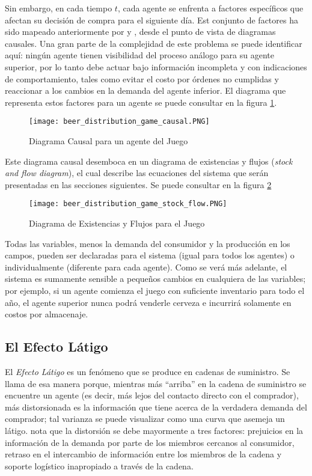 Sin embargo, en cada tiempo $t$, cada agente se enfrenta a factores espec\'ificos que afectan su decisi\'on de compra para el siguiente d\'ia. Est conjunto de factores ha sido mapeado anteriormente por \citet{Duggan} y \citet{Grasl}, desde el punto de vista de diagramas causales. Una gran parte de la complejidad de este problema se puede identificar aqu\'i: ning\'un agente tienen visibilidad del proceso an\'alogo para su agente superior, por lo tanto debe actuar bajo informaci\'on incompleta y con indicaciones de comportamiento, tales como evitar el costo por \'ordenes no cumplidas y reaccionar a los cambios en la demanda del agente inferior. El diagrama que representa estos factores para un agente se puede consultar en la figura \ref{causal}.

\begin{figure}[ht]
\caption{Diagrama Causal para un agente del Juego}
\label{causal}
\texttt{[image: beer\_distribution\_game\_causal.PNG]}
\centering
\end{figure}

Este diagrama causal desemboca en un diagrama de existencias y flujos (\textit{stock and flow diagram}), el cual describe las ecuaciones del sistema que ser\'an presentadas en las secciones siguientes. Se puede consultar en la figura \ref{stockflow}

\begin{figure}[ht]
\caption{Diagrama de Existencias y Flujos para el Juego}
\label{stockflow}
\texttt{[image: beer\_distribution\_game\_stock\_flow.PNG]}
\centering
\end{figure}

Todas las variables, menos la demanda del consumidor y la producci\'on en los campos, pueden ser declaradas para el sistema (igual para todos los agentes) o individualmente (diferente para cada agente). Como se ver\'a m\'as adelante, el sistema es sumamente sensible a peque\~nos cambios en cualquiera de las variables; por ejemplo, si un agente comienza el juego con suficiente inventario para todo el a\~no, el agente superior nunca podr\'a venderle cerveza e incurrir\'a solamente en costos por almacenaje.

\subsection{El Efecto Látigo}

El \textit{Efecto Látigo} es un fen\'omeno que se produce en cadenas de suministro. Se llama de esa manera porque, mientras m\'as ``arriba'' en la cadena de suministro se encuentre un agente (es decir, m\'as lejos del contacto directo con el comprador), m\'as distorsionada es la informaci\'on que tiene acerca de la verdadera demanda del comprador; tal varianza se puede visualizar como una curva que asemeja un l\'atigo. \citet{Chaharsooghi} nota que la distorsi\'on se debe mayormente a tres factores: prejuicios en la informaci\'on de la demanda por parte de los miembros cercanos al consumidor, retraso en el intercambio de informaci\'on entre los miembros de la cadena y soporte log\'istico inapropiado a trav\'es de la cadena. \\

